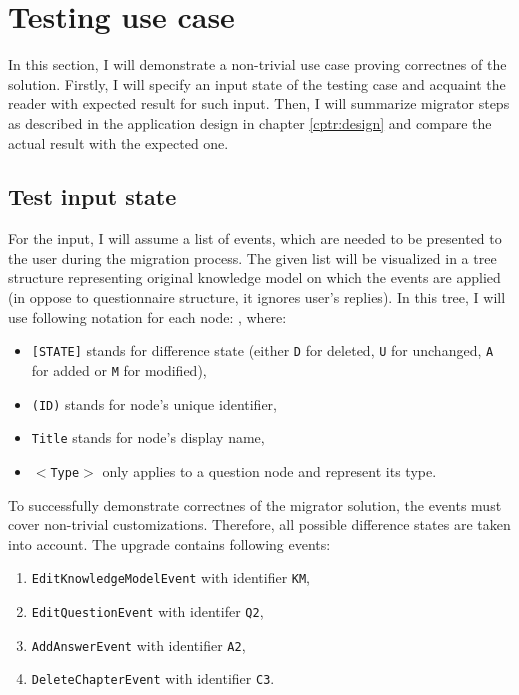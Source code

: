 \section{Testing use case}\label{sec:testing-use-case}

In this section, I will demonstrate a non-trivial use case proving correctnes of the solution.
Firstly, I will specify an input state of the testing case and acquaint the reader with expected result for such input.
Then, I will summarize migrator steps as described in the application design in chapter \ref{cptr:design} and compare the actual result with the expected one.

\subsection{Test input state}

For the input, I will assume a list of events, which are needed to be presented to the user during the migration process.
The given list will be visualized in a tree structure representing original knowledge model on which the events are applied (in oppose to questionnaire structure, it ignores user's replies).
In this tree, I will use following notation for each node: , where:

\begin{itemize}
    \item \texttt{[STATE]} stands for difference state (either \texttt{D} for deleted, \texttt{U} for unchanged, \texttt{A} for added or \texttt{M} for modified),
    \item \texttt{(ID)} stands for node's unique identifier,
    \item \texttt{Title} stands for node's display name,
    \item \texttt{$<$Type$>$} only applies to a question node and represent its type. 
\end{itemize}

To successfully demonstrate correctnes of the migrator solution, the events must cover non-trivial customizations.
Therefore, all possible difference states are taken into account.
The upgrade contains following events:

\begin{enumerate}
    \item \texttt{EditKnowledgeModelEvent} with identifier \texttt{KM},
    \item \texttt{EditQuestionEvent} with identifer \texttt{Q2},
    \item \texttt{AddAnswerEvent} with identifier \texttt{A2},
    \item \texttt{DeleteChapterEvent} with identifier \texttt{C3}.
\end{enumerate}

